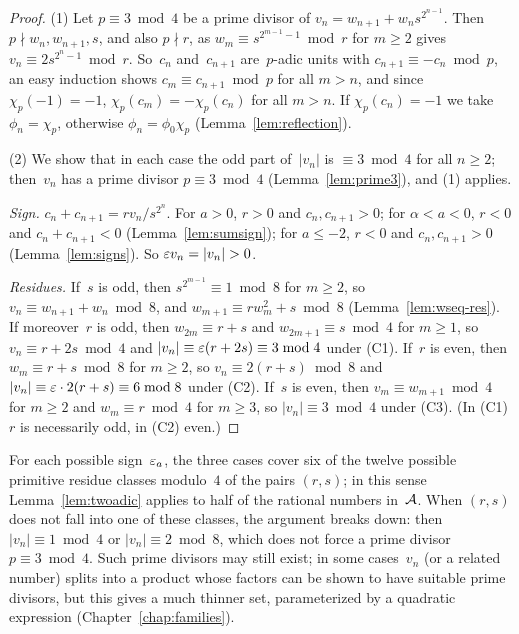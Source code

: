 \begin{proof}
  \leanok
  (1) Let $p \equiv 3 \bmod 4$ be a prime divisor of $v_n = w_{n+1} + w_n s^{2^{n-1}}$. Then
  $p \nmid w_n, w_{n+1}, s$, and also $p \nmid r$, as
  $w_m \equiv s^{2^{m-1} - 1} \bmod r$ for $m \ge 2$ gives $v_n \equiv 2 s^{2^n - 1} \bmod r$.
  So~$c_n$ and~$c_{n+1}$ are~$p$-adic units with $c_{n+1} \equiv -c_n \bmod p$, an easy induction
  shows $c_m \equiv c_{n+1} \bmod p$ for all $m > n$, and since $\chi_p(-1) = -1$,
  $\chi_p(c_m) = -\chi_p(c_n)$ for all $m > n$. If $\chi_p(c_n) = -1$ we take $\phi_n = \chi_p$,
  otherwise $\phi_n = \phi_0 \chi_p$ (Lemma~\ref{lem:reflection}).

  (2) We show that in each case the odd part of~$|v_n|$ is $\equiv 3 \bmod 4$ for all $n \ge 2$;
  then~$v_n$ has a prime divisor $p \equiv 3 \bmod 4$ (Lemma~\ref{lem:prime3}), and (1) applies.

  \emph{Sign.} $c_n + c_{n+1} = r v_n / s^{2^n}$. For $a > 0$, $r > 0$ and $c_n, c_{n+1} > 0$; for
  $\alpha < a < 0$, $r < 0$ and $c_n + c_{n+1} < 0$ (Lemma~\ref{lem:sumsign}); for $a \le -2$,
  $r < 0$ and $c_n, c_{n+1} > 0$ (Lemma~\ref{lem:signs}). So $\varepsilon v_n = |v_n| > 0$.

  \emph{Residues.} If~$s$ is odd, then $s^{2^{m-1}} \equiv 1 \bmod 8$ for $m \ge 2$, so
  $v_n \equiv w_{n+1} + w_n \bmod 8$, and $w_{m+1} \equiv r w_m^2 + s \bmod 8$
  (Lemma~\ref{lem:wseq-res}). If moreover~$r$ is odd, then $w_{2m} \equiv r + s$ and
  $w_{2m+1} \equiv s \bmod 4$ for $m \ge 1$, so $v_n \equiv r + 2s \bmod 4$ and
  $|v_n| \equiv \varepsilon(r + 2s) \equiv 3 \bmod 4$ under (C1). If~$r$ is even, then
  $w_m \equiv r + s \bmod 8$ for $m \ge 2$, so $v_n \equiv 2(r + s) \bmod 8$ and
  $|v_n| \equiv \varepsilon \cdot 2(r + s) \equiv 6 \bmod 8$ under (C2). If~$s$ is even, then
  $v_m \equiv w_{m+1} \bmod 4$ for $m \ge 2$ and $w_m \equiv r \bmod 4$ for $m \ge 3$, so
  $|v_n| \equiv 3 \bmod 4$ under (C3). (In (C1) $r$ is necessarily odd, in (C2) even.)
\end{proof}

For each possible sign~$\varepsilon_a$, the three cases cover six of the twelve possible primitive
residue classes modulo~$4$ of the pairs $(r, s)$; in this sense Lemma~\ref{lem:twoadic} applies
to half of the rational numbers in~$\mathcal{A}$. When $(r, s)$ does not fall into one of these
classes, the argument breaks down: then $|v_n| \equiv 1 \bmod 4$ or $|v_n| \equiv 2 \bmod 8$,
which does not force a prime divisor $p \equiv 3 \bmod 4$. Such prime divisors may still exist;
in some cases~$v_n$ (or a related number) splits into a product whose factors can be shown to
have suitable prime divisors, but this gives a much thinner set, parameterized by a quadratic
expression (Chapter~\ref{chap:families}).
